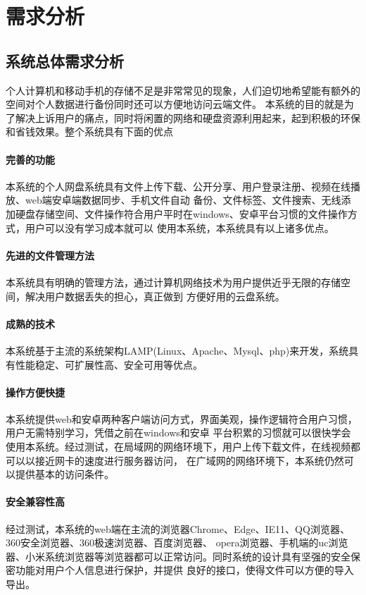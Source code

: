 \section{需求分析}
\subsection{系统总体需求分析}
个人计算机和移动手机的存储不足是非常常见的现象，人们迫切地希望能有额外的空间对个人数据进行备份同时还可以方便地访问云端文件。
本系统的目的就是为了解决上诉用户的痛点，同时将闲置的网络和硬盘资源利用起来，起到积极的环保和省钱效果。整个系统具有下面的优点

\paragraph{完善的功能}本系统的个人网盘系统具有文件上传下载、公开分享、用户登录注册、视频在线播放、web端安卓端数据同步、手机文件自动
备份、文件标签、文件搜索、无线添加硬盘存储空间、文件操作符合用户平时在windows、安卓平台习惯的文件操作方式，用户可以没有学习成本就可以
使用本系统，本系统具有以上诸多优点。
\paragraph{先进的文件管理方法}本系统具有明确的管理方法，通过计算机网络技术为用户提供近乎无限的存储空间，解决用户数据丢失的担心，真正做到
方便好用的云盘系统。
\paragraph{成熟的技术}本系统基于主流的系统架构LAMP(Linux、Apache、Mysql、php)来开发，系统具有性能稳定、可扩展性高、安全可用等优点。
\paragraph{操作方便快捷}本系统提供web和安卓两种客户端访问方式，界面美观，操作逻辑符合用户习惯，用户无需特别学习，凭借之前在windows和安卓
平台积累的习惯就可以很快学会使用本系统。经过测试，在局域网的网络环境下，用户上传下载文件，在线视频都可以以接近网卡的速度进行服务器访问，
在广域网的网络环境下，本系统仍然可以提供基本的访问条件。
\paragraph{安全兼容性高}经过测试，本系统的web端在主流的浏览器Chrome、Edge、IE11、QQ浏览器、360安全浏览器、360极速浏览器、百度浏览器、
opera浏览器、手机端的uc浏览器、小米系统浏览器等浏览器都可以正常访问。同时系统的设计具有坚强的安全保密功能对用户个人信息进行保护，并提供
良好的接口，使得文件可以方便的导入导出。

